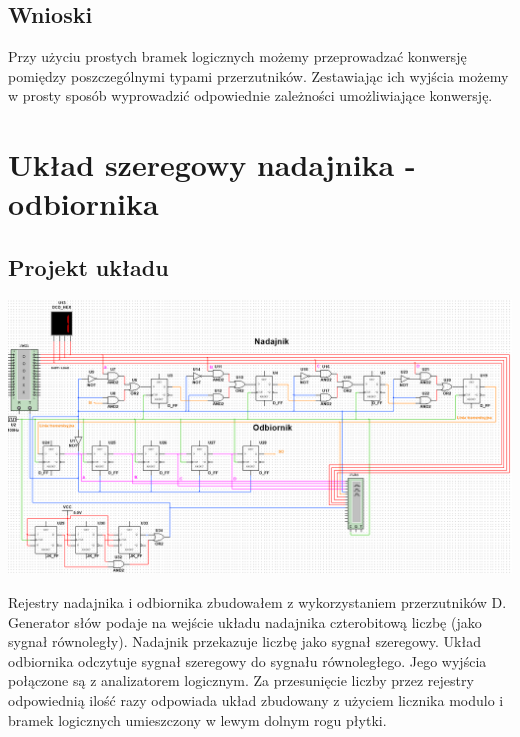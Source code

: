 \documentclass{article}
\begin{document}
            
        \subsection{Wnioski}
            Przy użyciu prostych bramek logicznych możemy przeprowadzać konwersję pomiędzy poszczególnymi typami przerzutników. Zestawiając ich wyjścia możemy w prosty sposób wyprowadzić odpowiednie zależności umożliwiające konwersję. 
    
    \section{Układ szeregowy nadajnika - odbiornika}
        \subsection{Projekt układu}
            \begin{center}
                \includegraphics[width=18cm]{reports/img/Z2C_1.png}\\
            \end{center}
            Rejestry nadajnika i odbiornika zbudowałem z wykorzystaniem przerzutników D. Generator słów podaje na wejście układu nadajnika czterobitową liczbę (jako sygnał równoległy). Nadajnik przekazuje liczbę jako sygnał szeregowy. Układ odbiornika odczytuje sygnał szeregowy do sygnału równoległego. Jego wyjścia połączone są z analizatorem logicznym. Za przesunięcie liczby przez rejestry odpowiednią ilość razy odpowiada układ zbudowany z użyciem licznika modulo i bramek logicznych umieszczony w lewym dolnym rogu płytki. 
            
\end{document}
